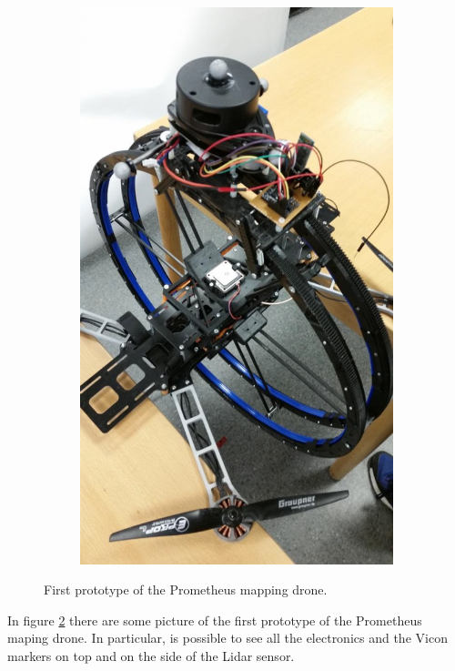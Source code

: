 \begin{figure}[h]
\begin{subfigure}[t]{0.49\textwidth}
		\includegraphics[scale = 0.25]{images/prometheus3.jpg}
		\label{subfig:prometheus4}
	\end{subfigure}
	\caption{First prototype of the Prometheus mapping drone.}
	\label{fig:prometheus}
\end{figure}

\noindent In figure \ref{fig:prometheus} there are some picture of the first prototype of the Prometheus maping drone. In particular, is possible to see all the electronics and the Vicon markers on top and on the side of the Lidar sensor.

